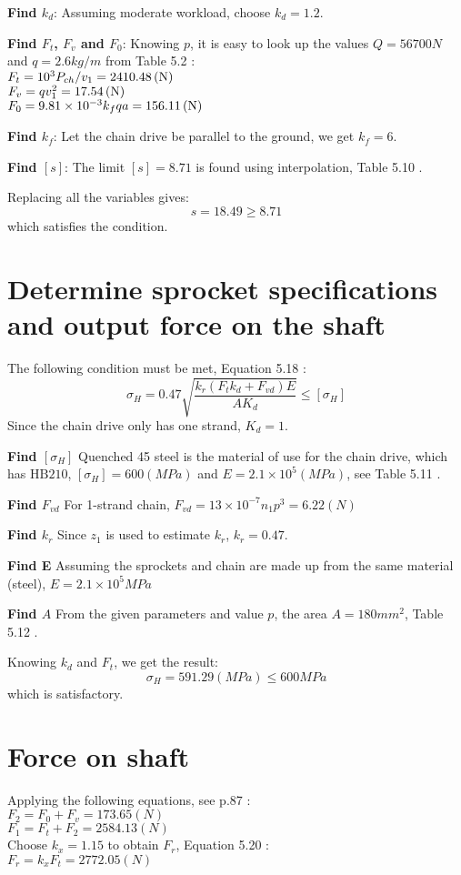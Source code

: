 \textbf{Find $ k_d $}: Assuming moderate workload, choose $ k_d = 1.2 $.

\textbf{Find $ F_t $, $ F_v $ and $ F_0 $}: Knowing $ p $, it is easy to look up the values $ Q=56700 \unit{N}$ and $ q=2.6\unit{kg/m} $ from Table 5.2 \cite{tk1}:\\
$ F_t = {10^3P_{ch}}/{v_1} = 2410.48 \, (\mathrm{N}) $\\
$ F_v=qv_1^2= 17.54 \, (\mathrm{N}) $\\
$ F_0=9.81\times10^{-3}k_fqa = 156.11\, (\mathrm{N})$

\textbf{Find $ k_f $}: Let the chain drive be parallel to the ground, we get $ k_f = 6 $.

\textbf{Find $ [s] $}: The limit $ [s] =8.71$ is found using interpolation, Table 5.10 \cite{tk1}.

Replacing all the variables gives:
\[s=18.49\geq8.71\]
which satisfies the condition.
\section{Determine sprocket specifications and output force on the shaft}
The following condition must be met, Equation 5.18 \cite{tk1}:
\[\sigma_H = 0.47\sqrt{\dfrac{k_r(F_tk_d+F_{vd})E}{AK_d}}\leq[\sigma_H]\]
Since the chain drive only has one strand, $ K_d = 1$.

\textbf{Find $ [\sigma_H] $} Quenched 45 steel is the material of use for the chain drive, which has $ \text{HB}210 $, $ [\sigma_H] = 600 \unit{(MPa)} $ and $ E = 2.1\times10^5 \unit{(MPa)} $, see Table 5.11 \cite{tk1}.

\textbf{Find $ F_{vd} $} For 1-strand chain, $ F_{vd} = 13\times10^{-7}n_1p^3 = 6.22 \unit{(N)}$

\textbf{Find $ k_r $} Since $ z_1 $ is used to estimate $ k_r $, $ k_r= 0.47$.

\textbf{Find E} Assuming the sprockets and chain are made up from the same material (steel), $ E=2.1\times10^5\unit{MPa} $

\textbf{Find $ A $} From the given parameters and value $ p $, the area $ A = 180 \unit{mm^2} $, Table 5.12 \cite{tk1}.

Knowing $ k_d $ and $ F_t $, we get the result:
\[\sigma_H = 591.29 \unit{(MPa)} \leq 600 \unit{MPa}\]
which is satisfactory.

\section{Force on shaft}
Applying the following equations, see p.87 \cite{tk1}:\\
$ F_2 = F_0 + F_v = 173.65 \unit{(N)}$\\
$ F_1 = F_t + F_2 = 2584.13 \unit{(N)}$\\
Choose $ k_x=1.15 $ to obtain $ F_r $, Equation 5.20 \cite{tk1}:\\
$ F_r = k_xF_t = 2772.05\unit{(N)} $


